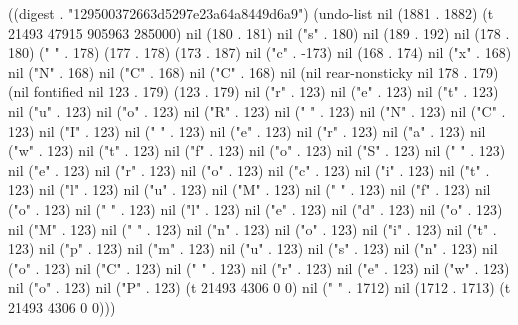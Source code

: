 
((digest . "129500372663d5297e23a64a8449d6a9") (undo-list nil (1881 . 1882) (t 21493 47915 905963 285000) nil (180 . 181) nil ("s" . 180) nil (189 . 192) nil (178 . 180) (" " . 178) (177 . 178) (173 . 187) nil ("c" . -173) nil (168 . 174) nil ("x" . 168) nil ("N" . 168) nil ("C" . 168) nil ("C" . 168) nil (nil rear-nonsticky nil 178 . 179) (nil fontified nil 123 . 179) (123 . 179) nil ("r" . 123) nil ("e" . 123) nil ("t" . 123) nil ("u" . 123) nil ("o" . 123) nil ("R" . 123) nil (" " . 123) nil ("N" . 123) nil ("C" . 123) nil ("I" . 123) nil (" " . 123) nil ("e" . 123) nil ("r" . 123) nil ("a" . 123) nil ("w" . 123) nil ("t" . 123) nil ("f" . 123) nil ("o" . 123) nil ("S" . 123) nil (" " . 123) nil ("e" . 123) nil ("r" . 123) nil ("o" . 123) nil ("c" . 123) nil ("i" . 123) nil ("t" . 123) nil ("l" . 123) nil ("u" . 123) nil ("M" . 123) nil (" " . 123) nil ("f" . 123) nil ("o" . 123) nil (" " . 123) nil ("l" . 123) nil ("e" . 123) nil ("d" . 123) nil ("o" . 123) nil ("M" . 123) nil (" " . 123) nil ("n" . 123) nil ("o" . 123) nil ("i" . 123) nil ("t" . 123) nil ("p" . 123) nil ("m" . 123) nil ("u" . 123) nil ("s" . 123) nil ("n" . 123) nil ("o" . 123) nil ("C" . 123) nil (" " . 123) nil ("r" . 123) nil ("e" . 123) nil ("w" . 123) nil ("o" . 123) nil ("P" . 123) (t 21493 4306 0 0) nil ("
" . 1712) nil (1712 . 1713) (t 21493 4306 0 0)))

